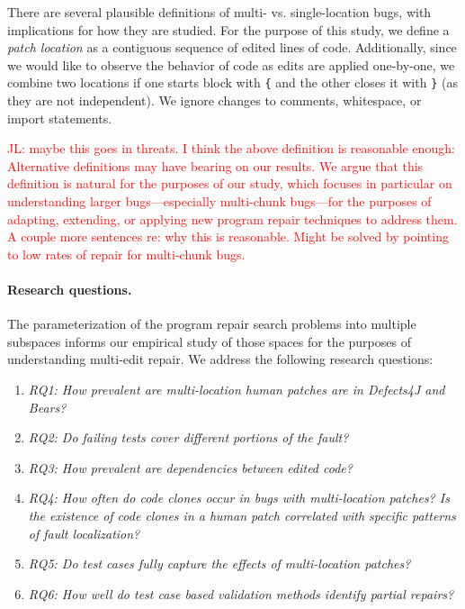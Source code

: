 \documentclass[sigconf, timestamp-false, anonymous=true]{acmart}
\newcommand\todo[1]{\textcolor{red}{#1}}
\begin{document}
There are several plausible definitions of multi- vs. single-location bugs, with
implications for how they are studied. For the purpose of this study, we define
a \emph{patch location} as a contiguous sequence of edited lines of
code. Additionally, since we would like to observe the behavior of code as edits
are applied one-by-one, we combine two locations if one starts block with
\texttt{\{} and the other closes it with \texttt{\}} (as they are not
independent). We ignore changes to comments, whitespace, or import statements.

\todo{JL: maybe this goes in threats. I think the above definition is reasonable
  enough: Alternative definitions may have bearing on our results.  We argue that this
definition is natural for the purposes of our study, which focuses in particular
on understanding larger bugs---especially multi-chunk bugs---for the purposes of 
adapting, extending, or applying new program repair techniques to address them. 
\todo{A couple more sentences re: why this is reasonable. Might be solved by 
pointing to low rates of repair for multi-chunk bugs.}}

\paragraph{Research questions.}  The parameterization of the program repair
search problems into multiple subspaces informs our empirical study of those
spaces for the purposes of understanding multi-edit repair.  We address the
following research questions:

\begin{enumerate}
\item \emph{RQ1: How prevalent are multi-location human patches are in Defects4J and Bears?}
\item \emph{RQ2: Do failing tests cover different portions of the fault?}
\item \emph{RQ3: How prevalent are dependencies between edited code?}
\item \emph{RQ4: How often do code clones occur in bugs with multi-location
  patches? Is the existence of code clones in a human patch correlated with specific
  patterns of fault localization?}
\item \emph{RQ5: Do test cases fully capture the effects of multi-location patches?}
\item \emph{RQ6: How well do test case based validation methods identify partial repairs?}

\end{enumerate}
\end{document}
